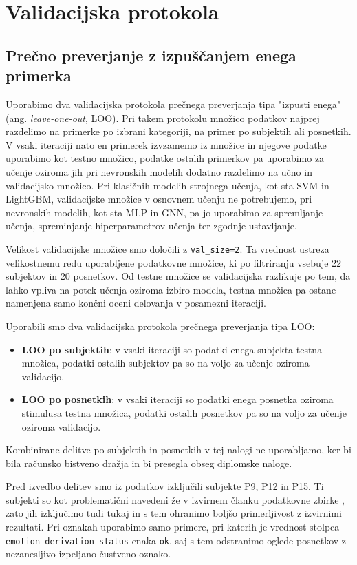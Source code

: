 \section{Validacijska protokola}
\label{subsec:validacijska-protokola}

\subsection{Prečno preverjanje z izpuščanjem enega primerka}

Uporabimo dva validacijska protokola prečnega preverjanja tipa "izpusti enega" (ang. \emph{leave-one-out}, LOO).
Pri takem protokolu množico podatkov najprej razdelimo na primerke po izbrani kategoriji, na primer po subjektih ali posnetkih.
V vsaki iteraciji nato en primerek izvzamemo iz množice in njegove podatke uporabimo kot testno množico, podatke ostalih primerkov pa uporabimo za učenje oziroma jih pri nevronskih modelih dodatno razdelimo na učno in validacijsko množico.
Pri klasičnih modelih strojnega učenja, kot sta SVM in LightGBM, validacijske množice v osnovnem učenju ne potrebujemo, pri nevronskih modelih, kot sta MLP in GNN, pa jo uporabimo za spremljanje učenja, spreminjanje hiperparametrov učenja ter zgodnje ustavljanje.

Velikost validacijske množice smo določili z \texttt{val\_size=2}.
Ta vrednost ustreza velikostnemu redu uporabljene podatkovne množice, ki po filtriranju vsebuje 22 subjektov in 20 posnetkov.
Od testne množice se validacijska razlikuje po tem, da lahko vpliva na potek učenja oziroma izbiro modela, testna množica pa ostane namenjena samo končni oceni delovanja v posamezni iteraciji.

Uporabili smo dva validacijska protokola prečnega preverjanja tipa LOO:
\begin{itemize}
    \item \textbf{LOO po subjektih}: v vsaki iteraciji so podatki enega subjekta testna množica, podatki ostalih subjektov pa so na voljo za učenje oziroma validacijo.
    \item \textbf{LOO po posnetkih}: v vsaki iteraciji so podatki enega posnetka oziroma stimulusa testna množica, podatki ostalih posnetkov pa so na voljo za učenje oziroma validacijo.
\end{itemize}

Kombinirane delitve po subjektih in posnetkih v tej nalogi ne uporabljamo, ker bi bila računsko bistveno dražja in bi presegla obseg diplomske naloge.

Pred izvedbo delitev smo iz podatkov izključili subjekte P9, P12 in P15.
Ti subjekti so kot problematični navedeni že v izvirnem članku podatkovne zbirke \MAHNOB{}, zato jih izključimo tudi tukaj in s tem ohranimo boljšo primerljivost z izvirnimi rezultati.
Pri oznakah uporabimo samo primere, pri katerih je vrednost stolpca \texttt{emotion-derivation-status} enaka \texttt{ok}, saj s tem odstranimo oglede posnetkov z nezanesljivo izpeljano čustveno oznako.

